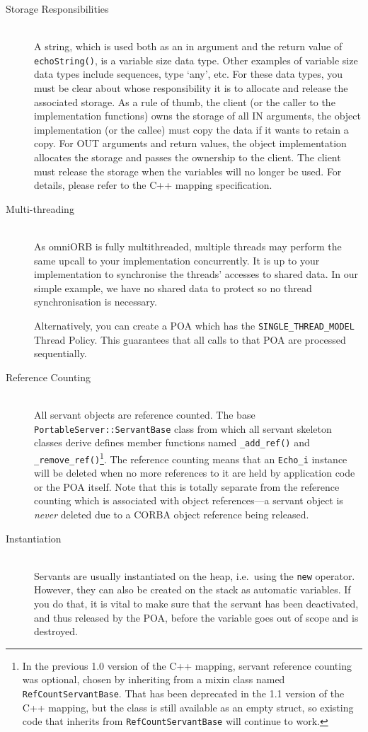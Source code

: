 \documentclass[11pt,twoside,a4paper]{book}
\newcommand{\type}[1]{\texttt{#1}}
\newcommand{\code}[1]{\texttt{#1}}
\newcommand{\op}[1]{\texttt{#1()}}
\newcommand{\dsc}{\discretionary{}{}{}}
\begin{document}
\begin{description}

\item[Storage Responsibilities]\mbox{}\\
%
A string, which is used both as an in argument and the return value of
\op{echoString}, is a variable size data type. Other examples of
variable size data types include sequences, type `any', etc. For these
data types, you must be clear about whose responsibility it is to
allocate and release the associated storage. As a rule of thumb, the
client (or the caller to the implementation functions) owns the
storage of all IN arguments, the object implementation (or the callee)
must copy the data if it wants to retain a copy. For OUT arguments and
return values, the object implementation allocates the storage and
passes the ownership to the client. The client must release the
storage when the variables will no longer be used.  For details,
please refer to the C++ mapping specification.

\item[Multi-threading]\mbox{}\\
%
As omniORB is fully multithreaded, multiple threads may perform the
same upcall to your implementation concurrently. It is up to your
implementation to synchronise the threads' accesses to shared data.
In our simple example, we have no shared data to protect so no thread
synchronisation is necessary.

Alternatively, you can create a POA which has the
\code{SINGLE\_THREAD\_MODEL} Thread Policy. This guarantees that all
calls to that POA are processed sequentially.

\item[Reference Counting]\mbox{}\\
%
All servant objects are reference counted. The base
\type{PortableServer::\dsc{}ServantBase} class from which all servant
skeleton classes derive defines member functions named \op{\_add\_ref}
and \op{\_remove\_ref}\footnote{In the previous 1.0 version of the C++
mapping, servant reference counting was optional, chosen by inheriting
from a mixin class named \type{RefCountServantBase}. That has been
deprecated in the 1.1 version of the C++ mapping, but the class is
still available as an empty struct, so existing code that inherits
from \type{RefCountServantBase} will continue to work.}. The reference
counting means that an \type{Echo\_i} instance will be deleted when no
more references to it are held by application code or the POA
itself. Note that this is totally separate from the reference counting
which is associated with object references---a servant object is
\emph{never} deleted due to a CORBA object reference being released.

\item[Instantiation]\mbox{}\\
%
Servants are usually instantiated on the heap, i.e.\ using the
\code{new} operator. However, they can also be created on the stack as
automatic variables. If you do that, it is vital to make sure that the
servant has been deactivated, and thus released by the POA, before the
variable goes out of scope and is destroyed.

\end{description}
\end{document}
